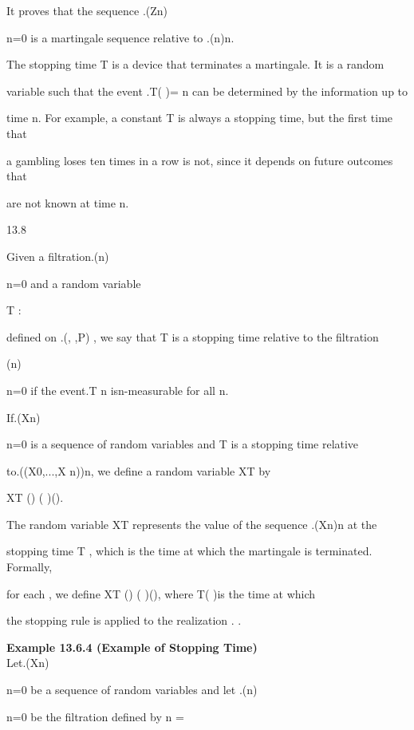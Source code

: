 It proves that the sequence .(Zn)\infty

n=0 is a martingale sequence relative to .(n)n.

The stopping time T is a device that terminates a martingale. It is a random

variable such that the event .{T( )= n} can be determined by the information up to

time n. For example, a constant T is always a stopping time, but the first time that

a gambling loses ten times in a row is not, since it depends on future outcomes that

are not known at time n.

\begin{defbox}{13.8}
\end{defbox}

Given a filtration.(n)\infty

n=0 and a random variable

T : \Omega {}\cup{ \infty }

defined on .(\Omega, ,P) , we say that T is a stopping time relative to the filtration

(n)\infty

n=0 if the event.{T \leq n} isn-measurable for all n.

If.(Xn)\infty

n=0 is a sequence of random variables and T is a stopping time relative

to.(\sigma(X0,...,X n))n, we define a random variable XT by

XT () \coloneqqXT( )().

The random variable XT represents the value of the sequence .(Xn)n at the

stopping time T , which is the time at which the martingale is terminated. Formally,

for each \in \Omega , we define XT () \coloneqqXT( )(), where T( )is the time at which

the stopping rule is applied to the realization . .

\textbf{Example 13.6.4 (Example of Stopping Time)} \\

Let.(Xn)\infty

n=0 be a sequence of random variables and let .(n)\infty

n=0 be the filtration defined by n =

